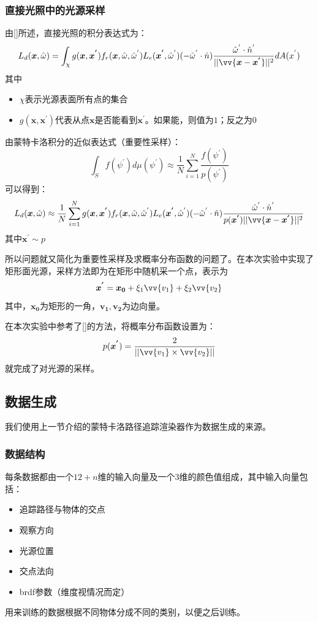 \subsubsection {直接光照中的光源采样}
由[\cite{shirley1996monte}]所述，直接光照的积分表达式为：
\[
    L_{d}(\bm{x},\hat{\omega})=\int_{\chi}g(\bm{x},\bm{x^{'}})f_{r}(\bm{x},\hat{\omega},\hat{\omega}^{'})L_{e}(\bm{x^{'}},\hat{\omega}^{'})(-\hat{\omega}^{'}\cdot\hat{n})\frac{\hat{\omega}^{'}\cdot\hat{n}^{'}}{||\vv{\bm{x}-\bm{x^{'}}}||^{2}}dA(x^{'})
\]
其中
\begin{itemize}[noitemsep]
    \item $\chi$表示光源表面所有点的集合
    \item $g(\bm{x},\bm{x^{'}})$代表从点$\bm{x}$是否能看到$\bm{x^{'}}$。如果能，则值为$1$；反之为$0$
\end{itemize}
由蒙特卡洛积分的近似表达式（重要性采样）：
\[
    \int_{S}f(\psi^{'})d\mu (\psi^{'})\approx\frac{1}{N}\sum_{i=1}^{N}\frac{f(\psi^{'})}{p(\psi^{'})}
\]
可以得到：
\[
    L_{d}(\bm{x},\hat{\omega})\approx \frac{1}{N}\sum_{i=1}^{N}g(\bm{x},\bm{x^{'}})f_{r}(\bm{x},\hat{\omega},\hat{\omega}^{'})L_{e}(\bm{x^{'}},\hat{\omega}^{'})(-\hat{\omega}^{'}\cdot\hat{n})\frac{\hat{\omega}^{'}\cdot\hat{n}^{'}}{p(\bm{x^{'}})||\vv{\bm{x}-\bm{x^{'}}}||^{2}}
\]
其中$\bm{x}^{'}\sim p$

所以问题就又简化为重要性采样及求概率分布函数的问题了。在本次实验中实现了矩形面光源，采样方法即为在矩形中随机采一个点，表示为
\[
    \bm{x^{'}}=\bm{x_{0}}+\xi_{1}\vv{v_{1}}+\xi_{2}\vv{v_{2}}
\]
其中，$\bm{x_{0}}$为矩形的一角，$\bm{v_{1}},\bm{v_{2}}$为边向量。

在本次实验中参考了[\cite{shirley1996monte}]的方法，将概率分布函数设置为：
\[
    p(\bm{x^{'}})=\frac{2}{||\vv{v_{1}}\times\vv{v_{2}}||}
\]
就完成了对光源的采样。

\subsection {数据生成}
我们使用上一节介绍的蒙特卡洛路径追踪渲染器作为数据生成的来源。
\subsubsection {数据结构}
每条数据都由一个$12+n$维的输入向量及一个$3$维的颜色值组成，其中输入向量包括：
\begin{itemize}[noitemsep]
    \item 追踪路径与物体的交点
    \item 观察方向
    \item 光源位置
    \item 交点法向
    \item brdf参数（维度视情况而定）
\end{itemize}
用来训练的数据根据不同物体分成不同的类别，以便之后训练。

